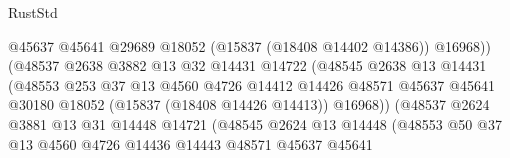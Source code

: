 \begin{lexlean}{RustStd}
\begin{coremodule}
{\begin{coremodule}
{{{{{{{{{{{{{{{{{{{{{{{{{{{{{{{{{{{{{{{{{{{{{{{{{{{{{{{{{{{{                                        @45637
                                        @45641
                                        @29689
                                        @18052
                                        (@15837 (@18408 @14402 @14386))
                                        @16968))
                                    (@48537
                                      @2638
                                      @3882
                                      @13
                                      @32
                                      @14431
                                      @14722
                                      (@48545
                                        @2638
                                        @13
                                        @14431
                                        (@48553
                                          @253
                                          @37
                                          @13
                                          @4560
                                          @4726
                                          @14412
                                          @14426
                                          @48571
                                          @45637
                                          @45641
                                          @30180
                                          @18052
                                          (@15837 (@18408 @14426 @14413))
                                          @16968))
                                      (@48537
                                        @2624
                                        @3881
                                        @13
                                        @31
                                        @14448
                                        @14721
                                        (@48545
                                          @2624
                                          @13
                                          @14448
                                          (@48553
                                            @50
                                            @37
                                            @13
                                            @4560
                                            @4726
                                            @14436
                                            @14443
                                            @48571
                                            @45637
                                            @45641
}}}}}}}}}}}}}}}}}}}}}}}}}}}}}}}}}}}}}}}}}}}}}}}}}}}}}}}}}}}}
\end{coremodule}}
\end{coremodule}
\end{lexlean}
